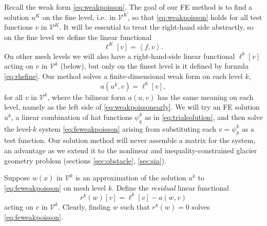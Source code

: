 \documentclass[letterpaper,final,12pt,reqno]{amsart}
\newcommand{\ip}[2]{\left<#1,#2\right>}
\begin{document}
Recall the weak form \eqref{eq:weakpoisson}.  The goal of our FE method is to find a solution $u^K$ on the fine level, i.e.~in $\mathcal{V}^K$, so that \eqref{eq:weakpoisson} holds for all test functions $v$ in $\mathcal{V}^K$.  It will be essential to treat the right-hand side abstractly, so on the fine level we define the linear functional
\begin{equation}
  \ell^K[v] = \ip{f}{v}.  \label{eq:rhsfine}
\end{equation}
On other mesh levels we will also have a right-hand-side linear functional $\ell^k[v]$ acting on $v$ in $\mathcal{V}^k$ (below), but only on the finest level is it defined by formula \eqref{eq:rhsfine}.  Our method solves a finite-dimensional weak form on each level $k$,
\begin{equation}
  a(u^k,v) = \ell^k[v],  \label{eq:feweakpoisson}
\end{equation}
for all $v$ in $\mathcal{V}^k$, where the bilinear form $a(u,v)$ has the same meaning on each level, namely as the left side of \eqref{eq:weakpoissonearly}.  We will try an FE solution $u^k$, a linear combination of hat functions $\psi_q^k$ as in \eqref{eq:trialsolution}, and then solve the level-$k$ system \eqref{eq:feweakpoisson} arising from substituting each $v=\psi_p^k$ as a test function.  Our solution method will never assemble a matrix for the system, an advantage as we extend it to the nonlinear and inequality-constrained glacier geometry problem (sections \ref{sec:obstacle}, \ref{sec:sia}).

Suppose $w(x)$ in $\mathcal{V}^k$ is an approximation of the solution $u^k$ to \eqref{eq:feweakpoisson} on mesh level $k$.  Define the \emph{residual} linear functional
\begin{equation}
  r^k(w)[v] = \ell^k[v] - a(w,v)  \label{eq:residual}
\end{equation}
acting on $v$ in $\mathcal{V}^k$.  Clearly, finding $w$ such that $r^k(w)=0$ solves \eqref{eq:feweakpoisson}.
\end{document}
